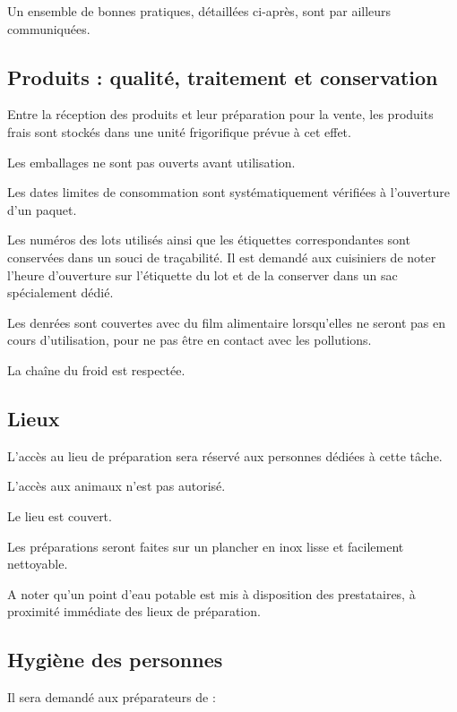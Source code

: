 \documentclass[hidelinks, paper=a4, fontsize=13pt]{report}
\begin{document}
Un ensemble de bonnes pratiques, détaillées ci-après, sont par ailleurs communiquées.

\subsection{Produits : qualité, traitement et conservation}

\begin{list}{•}{}
	\item Entre la réception des produits et leur préparation pour la vente, les produits frais sont stockés dans une unité frigorifique prévue à cet effet.
	\item Les emballages ne sont pas ouverts avant utilisation.
	\item Les dates limites de consommation sont systématiquement vérifiées à l’ouverture d’un paquet.
	\item Les numéros des lots utilisés ainsi que les étiquettes correspondantes sont conservées dans un souci de traçabilité. Il est demandé aux cuisiniers de noter l’heure d’ouverture sur l’étiquette du lot et de la conserver dans un sac spécialement dédié.
	\item Les denrées sont couvertes avec du film alimentaire lorsqu’elles ne seront pas en cours d’utilisation, pour ne pas être en contact avec les pollutions.
	\item La chaîne du froid est respectée.
\end{list}

\subsection{Lieux}

\begin{list}{•}{}
	\item L’accès au lieu de préparation sera réservé aux personnes dédiées à cette tâche.
	\item L’accès aux animaux n’est pas autorisé.
	\item Le lieu est couvert.
	\item Les préparations seront faites sur un plancher en inox lisse et facilement nettoyable.
\end{list}

A noter qu'un point d'eau potable est mis à disposition des prestataires, à proximité immédiate des lieux de préparation.

\subsection{Hygiène des personnes}
Il sera demandé aux préparateurs de :
\end{document}
